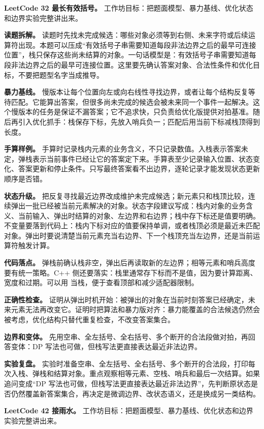 \noindent\textbf{LeetCode 32 最长有效括号。} 工作坊目标：把题面模型、暴力基线、优化状态和边界实验完整讲出来。

\textbf{读题拆解。} 读题时先找未完成候选：哪些对象必须等到右侧、未来字符或后续运算符出现。本题可以压成“有效括号子串需要知道每段非法边界之后的最早可连接位置”，栈只保存这些尚未结算的对象。一句话模型是：有效括号子串需要知道每段非法边界之后的最早可连接位置。这里要先确认答案对象、合法性条件和优化目标，不要把题型名字当成推导。

\textbf{暴力基线。} 慢版本让每个位置向左或向右线性寻找边界，或者让每个结构反复等待匹配。它能算出答案，但很多尚未完成的候选会被未来同一个事件一起解决。这个慢版本的任务是保证不漏答案；它不追求快，只负责给优化版提供对拍基准。随后再引入优化抓手：栈保存下标，先放入哨兵负一；匹配后用当前下标减栈顶得到长度。

\textbf{手算样例。} 手算时记录栈内元素的业务含义，不只记录数值。入栈表示答案未定，弹栈表示当前事件已经让它的答案定下来。手算表至少记录输入位置、状态变化、答案更新和停止条件。只写最终答案看不出边界，逐轮记录才能发现状态更新顺序是否错。

\textbf{状态升级。} 把反复寻找最近边界改成维护未完成候选；新元素只和栈顶比较，连续弹出一批已经被当前元素解决的对象。状态字段建议写成：栈内对象的业务含义、当前输入、弹出时结算的对象、左边界和右边界；栈中存下标还是值要明确。不变量要落到代码上：栈内下标对应的值要保持单调，或者栈顶必须是最近未匹配对象。弹出时要说清楚当前元素充当右边界、下一个栈顶充当左边界，还是当前运算符触发计算。

\textbf{代码落点。} 弹栈前确认栈非空，弹出后再读取新的左边界；相等元素和哨兵高度要有统一策略。C++ 侧还要落实：栈里通常存下标而不是值，因为要计算距离、宽度和过期。可以用  当栈，便于查看顶部和减少适配器限制。

\textbf{正确性检查。} 证明从弹出时机开始：被弹出的对象在当前时刻答案已经确定，未来元素无法再改变它。证明时把算法和暴力版对齐：暴力能覆盖的合法候选仍然会被考虑，优化结构只替代重复检查，不改变答案集合。

\textbf{边界和变体。} 先用空串、全左括号、全右括号、多个断开的合法段做对拍，再回答变体：DP 写法也可做，但栈写法更直接表达最近非法边界。

\textbf{实验复盘。} 实验时准备空串、全左括号、全右括号、多个断开的合法段，打印每次入栈、弹栈和结算对象。重点观察相等元素、空栈、哨兵和最后一次结算。如果追问变成“DP 写法也可做，但栈写法更直接表达最近非法边界”，先判断原状态是否仍然覆盖新答案集合，再决定是微调边界、改状态语义，还是换成另一类结构。

\noindent\textbf{LeetCode 42 接雨水。} 工作坊目标：把题面模型、暴力基线、优化状态和边界实验完整讲出来。

